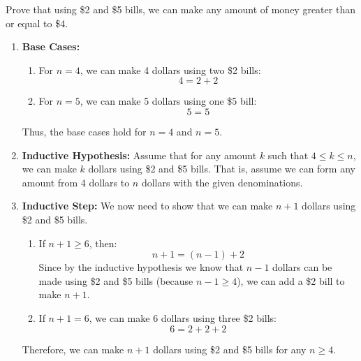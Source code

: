 \begin{example}
    Prove that using \$2 and \$5 bills, we can make any amount of money greater than or equal to \$4.
    \begin{enumerate}

        \item \textbf{Base Cases:}
        \begin{enumerate}
            \item For \( n = 4 \), we can make 4 dollars using two \$2 bills:
            \[
            4 = 2 + 2
            \]
            \item For \( n = 5 \), we can make 5 dollars using one \$5 bill:
            \[
            5 = 5
            \]
        \end{enumerate}
        Thus, the base cases hold for \( n = 4 \) and \( n = 5 \).

        \item \textbf{Inductive Hypothesis:} Assume that for any amount \( k \) such that \( 4 \leq k \leq n \), we can make \( k \) dollars using \$2 and \$5 bills. That is, assume we can form any amount from 4 dollars to \( n \) dollars with the given denominations.

        \item \textbf{Inductive Step:} We now need to show that we can make \( n + 1 \) dollars using \$2 and \$5 bills.

        \begin{enumerate}
            \item If \( n + 1 \geq 6 \), then:
            \[
            n + 1 = (n - 1) + 2
            \]
            Since by the inductive hypothesis we know that \( n - 1 \) dollars can be made using \$2 and \$5 bills (because \( n - 1 \geq 4 \)), we can add a \$2 bill to make \( n + 1 \).

            \item If \( n + 1 = 6 \), we can make 6 dollars using three \$2 bills:
            \[
            6 = 2 + 2 + 2
            \]
        \end{enumerate}
        Therefore, we can make \( n + 1 \) dollars using \$2 and \$5 bills for any \( n \geq 4 \).
    \end{enumerate}

\end{example}

